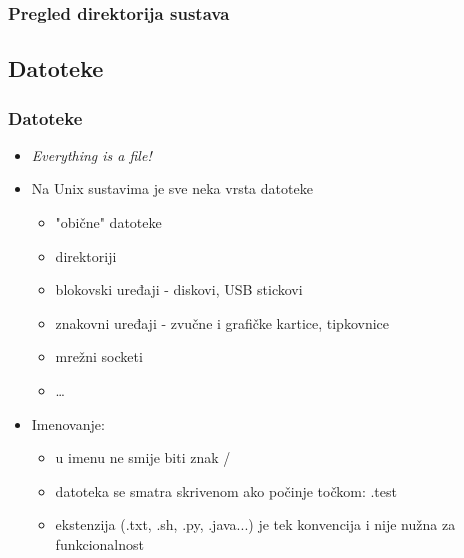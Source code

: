 \documentclass{beamer}
\begin{document}
\begin{frame}[t]
\frametitle{Pregled direktorija sustava}
  \begin{flushleft}
  \end{flushleft}
\end{frame}

\subsection{Datoteke}
\begin{frame}[t]
\frametitle{Datoteke}
  \begin{itemize}
    \item \textit{Everything is a file!}
    \item Na Unix sustavima je sve neka vrsta datoteke
      \begin{itemize}
        \item "obične" datoteke
        \item direktoriji
        \item blokovski uređaji - diskovi, USB stickovi
        \item znakovni uređaji - zvučne i grafičke kartice, tipkovnice
        \item mrežni socketi
        \item \dots
      \end{itemize}
    \vfill
    \item Imenovanje: 
    \begin{itemize}
      \item u imenu ne smije biti znak /
      \item datoteka se smatra skrivenom ako počinje točkom: .test
      \item ekstenzija (.txt, .sh, .py, .java...) je tek konvencija i nije nužna za funkcionalnost
    \end{itemize}
  \end{itemize}
\end{frame}
\end{document}
